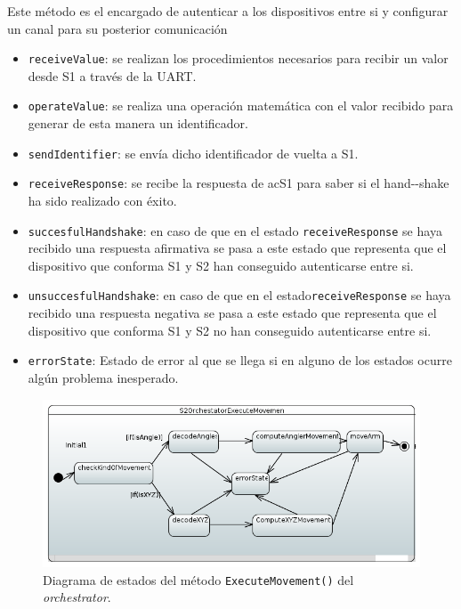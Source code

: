 Este método es el encargado de autenticar a los dispositivos entre si y configurar un canal para su posterior comunicación

\begin{itemize}
    \item \texttt{receiveValue}: se realizan los procedimientos necesarios para recibir un valor desde \ac{S1} a través de la \ac{UART}.
    \item \texttt{operateValue}: se realiza una operación matemática con el valor recibido para generar de esta manera un identificador.
    \item \texttt{sendIdentifier}: se envía dicho identificador de vuelta a \ac{S1}.
    \item \texttt{receiveResponse}: se recibe la respuesta de ac{S1} para saber si el \ac{hand--shake} ha sido realizado con éxito.
    \item \texttt{succesfulHandshake}: en caso de que en el estado
    \texttt{receiveResponse} se haya recibido una respuesta afirmativa se pasa a este estado que representa que el dispositivo que conforma S1 y S2 han conseguido autenticarse entre si.
    \item \texttt{unsuccesfulHandshake}: en caso de que en el estado\texttt{receiveResponse} se haya recibido una respuesta negativa se pasa a este estado que representa que el dispositivo que conforma S1 y S2 no han conseguido autenticarse
    entre si.
    \item \texttt{errorState}: Estado de error al que se llega si en alguno de los estados ocurre algún problema inesperado. 
\end{itemize}

\begin{figure}[H]
    \centering
    \includegraphics[width=1\linewidth]{pictures/S2OrchestratorExecuteMovement.PNG}
    \caption{Diagrama de estados del método \texttt{ExecuteMovement()} del \textit{orchestrator}.}
    \label{fig:fun_execute_movement_orchestrator}
\end{figure}

